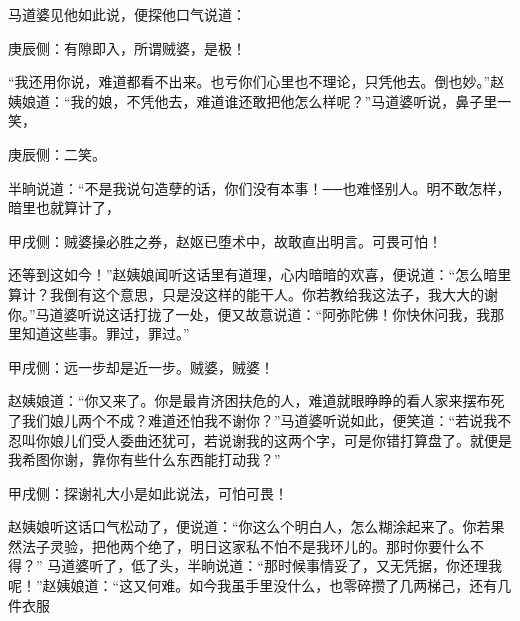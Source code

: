 \begin{parag}
    马道婆见他如此说，便探他口气说道：\begin{note}庚辰侧：有隙即入，所谓贼婆，是极！\end{note}“我还用你说，难道都看不出来。也亏你们心里也不理论，只凭他去。倒也妙。”赵姨娘道：“我的娘，不凭他去，难道谁还敢把他怎么样呢？”马道婆听说，鼻子里一笑，\begin{note}庚辰侧：二笑。\end{note}半晌说道：“不是我说句造孽的话，你们没有本事！──也难怪别人。明不敢怎样，暗里也就算计了，\begin{note}甲戌侧：贼婆操必胜之券，赵妪已堕术中，故敢直出明言。可畏可怕！\end{note}还等到这如今！”赵姨娘闻听这话里有道理，心内暗暗的欢喜，便说道：“怎么暗里算计？我倒有这个意思，只是没这样的能干人。你若教给我这法子，我大大的谢你。”马道婆听说这话打拢了一处，便又故意说道：“阿弥陀佛！你快休问我，我那里知道这些事。罪过，罪过。”\begin{note}甲戌侧：远一步却是近一步。贼婆，贼婆！\end{note}赵姨娘道：“你又来了。你是最肯济困扶危的人，难道就眼睁睁的看人家来摆布死了我们娘儿两个不成？难道还怕我不谢你？”马道婆听说如此，便笑道：“若说我不忍叫你娘儿们受人委曲还犹可，若说谢我的这两个字，可是你错打算盘了。就便是我希图你谢，靠你有些什么东西能打动我？”\begin{note}甲戌侧：探谢礼大小是如此说法，可怕可畏！\end{note}赵姨娘听这话口气松动了，便说道：“你这么个明白人，怎么糊涂起来了。你若果然法子灵验，把他两个绝了，明日这家私不怕不是我环儿的。那时你要什么不得？” 马道婆听了，低了头，半晌说道：“那时候事情妥了，又无凭据，你还理我呢！”赵姨娘道：“这又何难。如今我虽手里没什么，也零碎攒了几两梯己，还有几件衣服
\end{parag}
